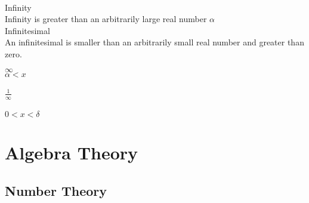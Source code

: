 \documentclass[12pt, a4paper,oneside]{book}
\begin{document}
    		\begin{paracol}{2}\
				\begin{leftcolumn}
					Infinity
						\\ Infinity is greater than an arbitrarily large real number $\alpha $ \\ 					Infinitesimal \\
						An infinitesimal is smaller than an arbitrarily small real number and 							greater than zero. 
				\end{leftcolumn}

				\begin{rightcolumn}
					$ \infty$ \\ $\alpha < x$ \\ \\ $\frac{1}{\infty}$ \\ \\ $0<x<\delta$
					\end{rightcolumn}
			\end{paracol}

	\part{Algebra Theory}
		
        \chapter{Number Theory}
		
\end{document}
